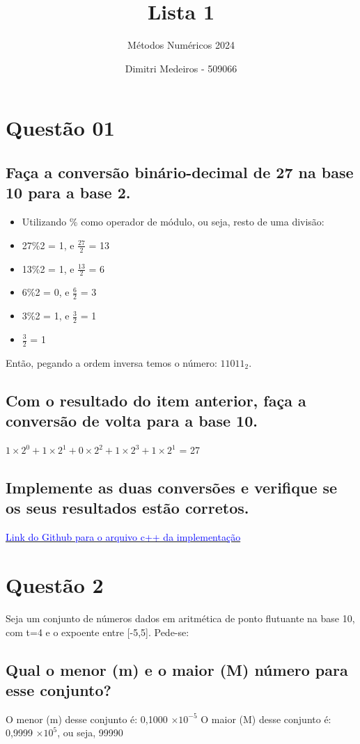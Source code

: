 \documentclass{article}
\title{Lista 1}
\author{Métodos Numéricos 2024}
\date{Dimitri Medeiros - 509066}
\begin{document}
\maketitle
\newpage

\section{Questão 01}
\subsection{Faça a conversão binário-decimal de 27 na base 10 para a base 2.}
\begin{itemize}
    \item Utilizando \% como operador de módulo, ou seja, resto de uma divisão:
    \item {27\%2 = 1, e $\frac{27}{2}$ = 13 }
    \item {13\%2 = 1, e $\frac{13}{2}$ = 6}
    \item {6\%2 = 0, e $\frac{6}{2}$ = 3}
    \item {3\%2 = 1, e $\frac{3}{2}$ = 1}
    \item {$\frac{3}{2}$ = 1}
    
\end{itemize}
Então, pegando a ordem inversa temos o número: $11011_2$.
\subsection{Com o resultado do item anterior, faça a conversão de volta para a base 10.}
$1\times2^0 + 1\times2^1 + 0\times2^2 + 1\times2^3 + 1\times2^1$ = 27
\subsection{Implemente as duas conversões e verifique se os seus resultados estão corretos.}
\href{https://github.com/itznokx/NumericalMethods/tree/master/t1}{\textcolor{blue}{Link do Github para o arquivo c++ da implementação}}
\section{Questão 2}
Seja um conjunto de números dados em aritmética de ponto flutuante na base 10, com t=4 e
o expoente entre [-5,5]. Pede-se:
\subsection{Qual o menor (m) e o maior (M) número para esse conjunto?}
O menor (m) desse conjunto é: 0,1000 $\times 10^{-5}$ \newline
O maior (M) desse conjunto é: 0,9999 $\times 10^5$, ou seja, 99990
\end{document}
